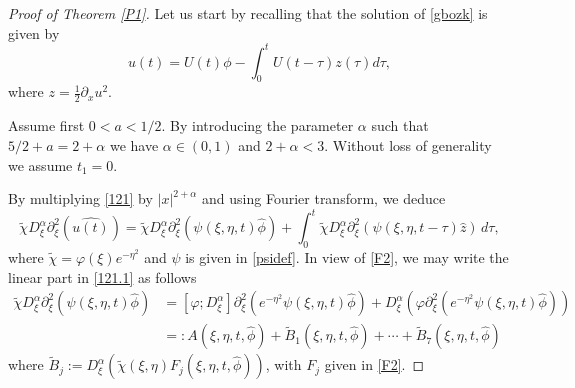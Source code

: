 \documentclass[reqno]{amsart}
\newcommand{\p}{\partial}
\numberwithin{equation}{section}
\begin{document}
\begin{proof}[Proof of Theorem \ref{P1}]
Let us start by recalling that the solution of \eqref{gbozk} is given by
\begin{equation}\label{121}
u(t)=U(t)\phi -\int_{0}^{t}U(t-\tau)z(\tau)d\tau,
\end{equation}
where $z=\frac12 \p_x u^2$.



Assume first $0<a<1/2$. By introducing the parameter $\alpha$ such that $5/2+a=2+\alpha$ we have $\alpha\in(0,1)$ and $2+\alpha<3$.
Without loss of generality we assume $t_1=0.$


By multiplying \eqref{121} by $|x|^{2+\alpha}$ and using Fourier transform, we deduce
\begin{equation}\label{121.1}
\tilde{\chi} D_{\xi}^{\alpha}\partial_{\xi}^2(\widehat{u(t)})=\tilde{\chi} D_{\xi}^{\alpha}\partial_{\xi}^2(\psi(\xi,\eta, t)\hat{\phi}) +\int_0^t \tilde{\chi} D_{\xi}^{\alpha}\partial_{\xi}^2(\psi(\xi,\eta, t-\tau)\hat{z})\,d\tau,
\end{equation}
where  $\tilde{\chi}=\varphi(\xi)e^{-\eta^2}$ and $\psi$ is given in \eqref{psidef}. In view of \eqref{F2},  we may write the linear part in \eqref{121.1} as follows
\begin{equation*}
\begin{split}
\tilde{\chi} D_{\xi}^{\alpha}\partial_{\xi}^2(\psi(\xi,\eta, t)\hat{\phi})&= [\varphi;D_{\xi}^{\alpha}]\partial_{\xi}^2(e^{-\eta^2}\psi(\xi,\eta,t) \hat{\phi})+D_\xi^{\alpha}(\varphi \p_\xi^2 (e^{-\eta^2}\psi(\xi,\eta, t) \hat{\phi}))\\
&=: A(\xi,\eta,t,\hat{\phi})+\tilde B_1(\xi,\eta,t,\hat{\phi})+\cdots+\tilde B_7(\xi,\eta,t,\hat{\phi})
\end{split}
\end{equation*}
where $\tilde{B}_j:=D^\alpha_\xi(\tilde{\chi}(\xi,\eta) F_j(\xi,\eta,t,\hat{\phi}))$, with $F_j$ given in \eqref{F2}.





\end{proof}
\end{document}
